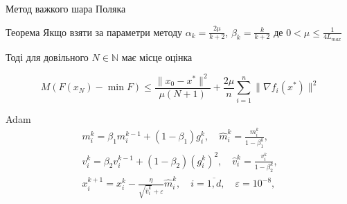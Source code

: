 \documentclass[a4paper, 14pt]{beamer}
\begin{document}
\begin{frame}{Метод важкого шара Поляка}
    \begin{theo}{Теорема}
        Якщо взяти за параметри методу $\alpha_k = \frac{2\mu}{k + 2}$, 
        $\beta_k = \frac{k}{k + 2}$ де $0 < \mu \le \frac{1}{4L_{max}}  $


        Тоді для довільного $N \in \mathbb{N}$ має місце оцінка


        $$M(F(x_N) - \min F) \le \frac{\|x_0 - x^*\|^2}{\mu(N+1)} + 
        \frac{2\mu}{n} \sum_{i = 1}^{n}\|\nabla f_i(x^*)\|^2$$
    \end{theo}
\end{frame}


\begin{frame}{Adam}
    \begin{equation}
        \begin{gathered}
            m_i^k=\beta_1 m_i^{k-1}+\left(1-\beta_1\right) g_i^k, \quad \hat{m}_i^k=\frac{m_i^k}{1-\beta_1^k}, \\
            v_i^k=\beta_2 v_i^{k-1}+\left(1-\beta_2\right)\left(g_i^k\right)^2, \quad \hat{v}_i^k=\frac{v_i^k}{1-\beta_2^k}, \\
            x_i^{k+1}=x_i^k-\frac{\eta}{\sqrt{\hat{v}_i^k}+\varepsilon} \hat{m}_i^k, \quad i=\overline{1, d}, \quad \varepsilon=10^{-8},
        \end{gathered}
    \end{equation}
\end{frame}
\end{document}
